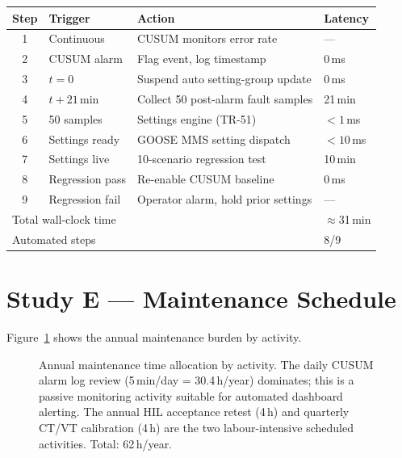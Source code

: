 \documentclass[11pt,a4paper]{article}
\begin{document}
\begin{center}
\begin{tabular}{@{}clll@{}}
\toprule
Step & Trigger & Action & Latency \\
\midrule
1 & Continuous & CUSUM monitors error rate & --- \\
2 & CUSUM alarm & Flag event, log timestamp & 0\,ms \\
3 & $t=0$ & Suspend auto setting-group update & 0\,ms \\
4 & $t+21$\,min & Collect 50 post-alarm fault samples & 21\,min \\
5 & 50 samples & Settings engine (TR-51) & $<1$\,ms \\
6 & Settings ready & GOOSE MMS setting dispatch & $<10$\,ms \\
7 & Settings live & 10-scenario regression test & 10\,min \\
8 & Regression pass & Re-enable CUSUM baseline & 0\,ms \\
9 & Regression fail & Operator alarm, hold prior settings & --- \\
\midrule
\multicolumn{3}{l}{Total wall-clock time} & $\approx$31\,min \\
\multicolumn{3}{l}{Automated steps} & 8/9 \\
\bottomrule
\end{tabular}
\end{center}

\section{Study E --- Maintenance Schedule}
\label{sec:studyE}

Figure~\ref{fig:maintenance} shows the annual maintenance burden by activity.

\begin{figure}[htbp]
  \centering
  \resizebox{0.96\textwidth}{!}{}
  \caption{Annual maintenance time allocation by activity.  The daily
           CUSUM alarm log review (5\,min/day = 30.4\,h/year) dominates;
           this is a passive monitoring activity suitable for automated
           dashboard alerting.  The annual HIL acceptance retest
           (4\,h) and quarterly CT/VT calibration (4\,h) are the two
           labour-intensive scheduled activities.  Total: 62\,h/year.}
  \label{fig:maintenance}
\end{figure}
\end{document}
